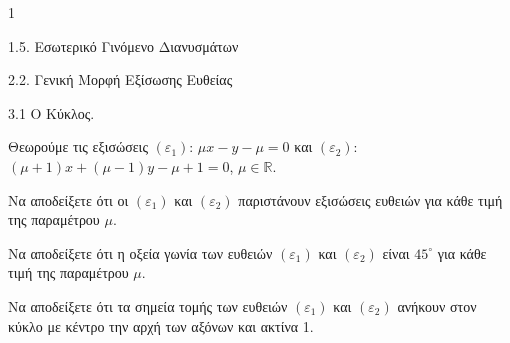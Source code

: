 \begin{ylh}{1}
    \item 1.5. Εσωτερικό Γινόμενο Διανυσμάτων
    \item 2.2. Γενική Μορφή Εξίσωσης Ευθείας
    \item 3.1 Ο Κύκλος.
\end{ylh}
Θεωρούμε τις εξισώσεις $(\varepsilon_1)$: $\mu x - y - \mu = 0$ και $(\varepsilon_2)$: $(\mu + 1)x + (\mu - 1)y - \mu + 1 = 0$, $\mu \in \mathbb{R}$.
\begin{alist}
\item Να αποδείξετε ότι οι $(\varepsilon_1)$ και $(\varepsilon_2)$ παριστάνουν εξισώσεις ευθειών για κάθε τιμή της παραμέτρου $\mu$. 
\item Να αποδείξετε ότι η οξεία γωνία των ευθειών $(\varepsilon_1)$ και $(\varepsilon_2)$ είναι $45^\circ$ για κάθε τιμή της παραμέτρου $\mu$. 
\item Να αποδείξετε ότι τα σημεία τομής των ευθειών $(\varepsilon_1)$ και $(\varepsilon_2)$ ανήκουν στον κύκλο με κέντρο την αρχή των αξόνων και ακτίνα 1. 
\end{alist}